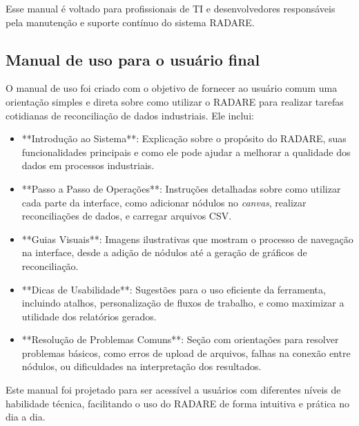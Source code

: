 Esse manual é voltado para profissionais de TI e desenvolvedores responsáveis pela manutenção e suporte contínuo do sistema RADARE.

\subsection{Manual de uso para o usuário final}

O manual de uso foi criado com o objetivo de fornecer ao usuário comum uma orientação simples e direta sobre como utilizar o RADARE para realizar tarefas cotidianas de reconciliação de dados industriais. Ele inclui:

\begin{itemize}
    \item **Introdução ao Sistema**: Explicação sobre o propósito do RADARE, suas funcionalidades principais e como ele pode ajudar a melhorar a qualidade dos dados em processos industriais.
    \item **Passo a Passo de Operações**: Instruções detalhadas sobre como utilizar cada parte da interface, como adicionar nódulos no \textit{canvas}, realizar reconciliações de dados, e carregar arquivos CSV.
    \item **Guias Visuais**: Imagens ilustrativas que mostram o processo de navegação na interface, desde a adição de nódulos até a geração de gráficos de reconciliação.
    \item **Dicas de Usabilidade**: Sugestões para o uso eficiente da ferramenta, incluindo atalhos, personalização de fluxos de trabalho, e como maximizar a utilidade dos relatórios gerados.
    \item **Resolução de Problemas Comuns**: Seção com orientações para resolver problemas básicos, como erros de upload de arquivos, falhas na conexão entre nódulos, ou dificuldades na interpretação dos resultados.
\end{itemize}

Este manual foi projetado para ser acessível a usuários com diferentes níveis de habilidade técnica, facilitando o uso do RADARE de forma intuitiva e prática no dia a dia.